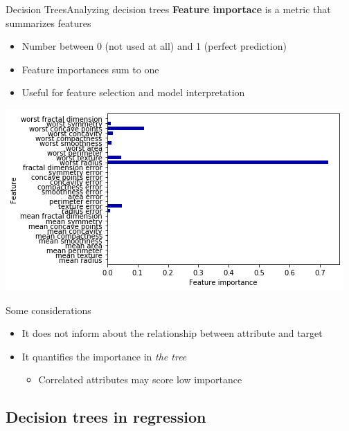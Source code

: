 \documentclass[10pt,compress]{beamer} %
\begin{document}
\begin{frame}{Decision Trees}{Analyzing decision trees}
    \textbf{Feature importace} is a metric that summarizes features
    \begin{itemize}
        \item Number between 0 (not used at all) and 1 (perfect prediction)
        \item Feature importances sum to one
        \item Useful for feature selection and model interpretation
    \end{itemize}

   \centering \includegraphics[width=0.5\linewidth]{figs/tree-importance.png}

   \flushleft

   \vspace{-0.5cm}

   Some considerations
   \begin{itemize}
       \item It does not inform about the relationship between attribute and target
       \item It quantifies the importance in \textit{the tree}
       \begin{itemize} 
            \item Correlated attributes may score low importance
       \end{itemize}
   \end{itemize}

\end{frame}

\subsection{Decision trees in regression}
\end{document}
